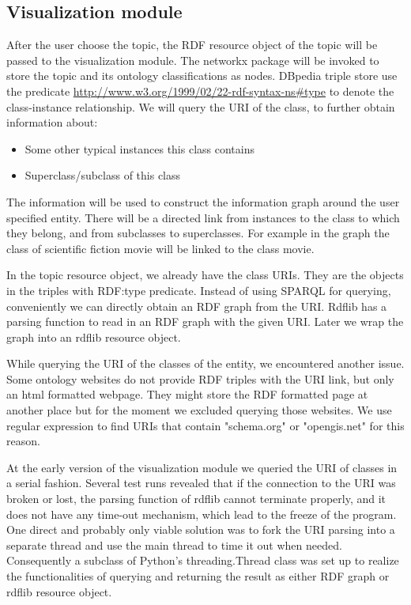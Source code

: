 \documentclass[12pt]{cls}
\begin{document}
\subsection{Visualization module}

After the user choose the topic, the RDF resource object of the topic will be passed to the visualization module. The networkx package will be invoked to store the topic and its ontology classifications as nodes. DBpedia triple store use the predicate \url{http://www.w3.org/1999/02/22-rdf-syntax-ns#type} to denote the class-instance relationship. We will query the URI of the class, to further obtain information about:

\begin{itemize}
\item Some other typical instances this class contains
\item Superclass/subclass of this class
\end{itemize}

The information will be used to construct the information graph around the user specified entity. There will be a directed link from instances to the class to which they belong, and from subclasses to superclasses. For example in the graph the class of scientific fiction movie will be linked to the class movie.

In the topic resource object, we already have the class URIs. They are the objects in the triples with RDF:type predicate. Instead of using SPARQL for querying, conveniently we can directly obtain an RDF graph from the URI. Rdflib has a parsing function to read in an RDF graph with the given URI. Later we wrap the graph into an rdflib resource object.

While querying the URI of the classes of the entity, we encountered another issue. Some ontology websites do not provide RDF triples with the URI link, but only an html formatted webpage. They might store the RDF formatted page at another place but for the moment we excluded querying those websites. We use regular expression to find URIs that contain "schema.org" or "opengis.net" for this reason.

At the early version of the visualization module we queried the URI of classes in a serial fashion. Several test runs revealed that if the connection to the URI was broken or lost, the parsing function of rdflib cannot terminate properly, and it does not have any time-out mechanism, which lead to the freeze of the program. One direct and probably only viable solution was to fork the URI parsing into a separate thread and use the main thread to time it out when needed. Consequently a subclass of Python's threading.Thread class was set up to realize the functionalities of querying and returning the result as either RDF graph or rdflib resource object.
\end{document}
